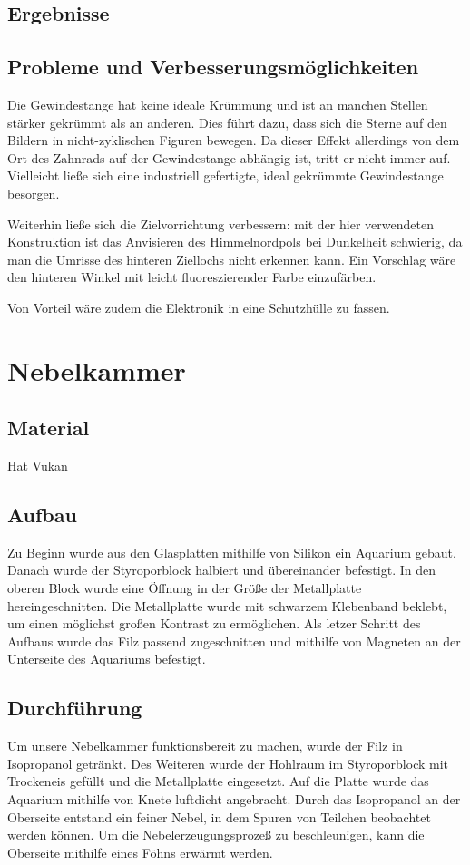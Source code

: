 \subsection{Ergebnisse}


\subsection{Probleme und Verbesserungsmöglichkeiten}

Die Gewindestange hat keine ideale Krümmung und ist an manchen Stellen stärker
gekrümmt als an anderen. Dies führt dazu, dass sich die Sterne auf den Bildern
in nicht-zyklischen Figuren bewegen. Da dieser Effekt allerdings von dem Ort des
Zahnrads auf der Gewindestange abhängig ist, tritt er nicht immer auf.
Vielleicht ließe sich eine industriell gefertigte, ideal gekrümmte Gewindestange
besorgen.

Weiterhin ließe sich die Zielvorrichtung verbessern: mit der hier verwendeten
Konstruktion ist das Anvisieren des Himmelnordpols bei Dunkelheit schwierig, da
man die Umrisse des hinteren Ziellochs nicht erkennen kann. Ein Vorschlag wäre
den hinteren Winkel mit leicht fluoreszierender Farbe einzufärben.

Von Vorteil wäre zudem die Elektronik in eine Schutzhülle zu fassen.

\section{Nebelkammer}

\subsection{Material}
Hat Vukan


\subsection{Aufbau}
Zu Beginn wurde aus den Glasplatten mithilfe von Silikon ein Aquarium gebaut.
Danach wurde der Styroporblock halbiert und übereinander befestigt. In den
oberen Block wurde eine Öffnung in der Größe der Metallplatte hereingeschnitten.
Die Metallplatte wurde mit schwarzem Klebenband beklebt, um einen möglichst
großen Kontrast zu ermöglichen. Als letzer Schritt des Aufbaus wurde das Filz
passend zugeschnitten und mithilfe von Magneten an der Unterseite des Aquariums
befestigt.

\subsection{Durchführung}
Um unsere Nebelkammer funktionsbereit zu machen, wurde der Filz in Isopropanol
getränkt. Des Weiteren wurde der Hohlraum im Styroporblock mit Trockeneis
gefüllt und die Metallplatte eingesetzt. Auf die Platte wurde das Aquarium
mithilfe von Knete luftdicht angebracht. Durch das Isopropanol an der Oberseite
entstand ein feiner Nebel, in dem Spuren von Teilchen beobachtet werden können.
Um die Nebelerzeugungsprozeß zu beschleunigen, kann die Oberseite mithilfe eines
Föhns erwärmt werden.

